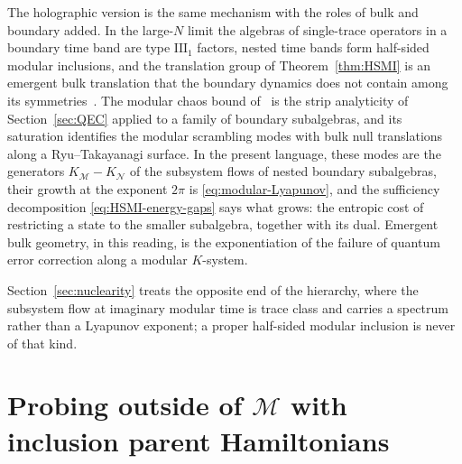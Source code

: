 \documentclass[a4paper,11pt]{article}
\theoremstyle{definition}
\newcommand{\mN}{\mathcal{N}}
\newcommand{\lb}{\left(}
\newcommand{\rb}{\right)}
\newcommand{\mH}{\mathcal{H}}
\newcommand{\mM}{\mathcal{M}}
\begin{document}
The holographic version is the same mechanism with the roles of bulk and boundary added. In the large-$N$ limit the algebras of single-trace operators in a boundary time band are type $\mathrm{III}_1$ factors, nested time bands form half-sided modular inclusions, and the translation group of Theorem~\ref{thm:HSMI} is an emergent bulk translation that the boundary dynamics does not contain among its symmetries~\cite{LeutheusserLiu2023}. The modular chaos bound of~\cite{deBoerLamprou2020} is the strip analyticity of Section~\ref{sec:QEC} applied to a family of boundary subalgebras, and its saturation identifies the modular scrambling modes with bulk null translations along a Ryu--Takayanagi surface. In the present language, these modes are the generators $K_{\mM}-K_{\mN}$ of the subsystem flows of nested boundary subalgebras, their growth at the exponent $2\pi$ is \eqref{eq:modular-Lyapunov}, and the sufficiency decomposition \eqref{eq:HSMI-energy-gaps} says what grows: the entropic cost of restricting a state to the smaller subalgebra, together with its dual. Emergent bulk geometry, in this reading, is the exponentiation of the failure of quantum error correction along a modular $K$-system.

Section~\ref{sec:nuclearity} treats the opposite end of the hierarchy, where the subsystem flow at imaginary modular time is trace class and carries a spectrum rather than a Lyapunov exponent; a proper half-sided modular inclusion is never of that kind.





\section{Probing outside of $\mM$ with inclusion parent Hamiltonians}
\label{sec:probing-outside-M}
\end{document}
